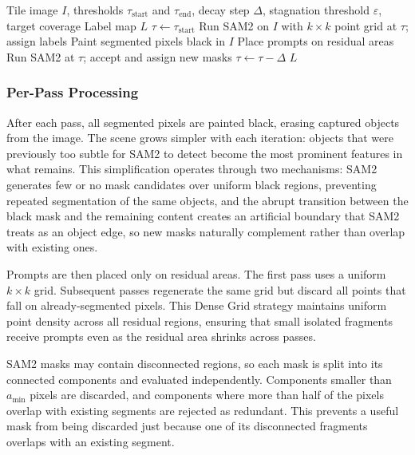 \documentclass[review,11pt,authoryear]{elsarticle}
\begin{document}
\begin{algorithm}[h!]
\caption{Multi-pass adaptive segmentation (per tile)}
\label{alg:multipass}
\begin{algorithmic}[1]
\REQUIRE Tile image $I$, thresholds $\tau_{\text{start}}$ and $\tau_{\text{end}}$, decay step $\Delta$, stagnation threshold $\varepsilon$, target coverage
\ENSURE Label map $L$
\STATE $\tau \leftarrow \tau_{\text{start}}$
\STATE Run SAM2 on $I$ with $k \times k$ point grid at $\tau$; assign labels
\REPEAT
    \STATE Paint segmented pixels black in $I$
    \STATE Place prompts on residual areas
    \STATE Run SAM2 at $\tau$; accept and assign new masks
        \STATE $\tau \leftarrow \tau - \Delta$
    \ENDIF
{}
\RETURN $L$
\end{algorithmic}
\end{algorithm}

\subsubsection{Per-Pass Processing}
\label{sec:method_pass}
\label{sec:method_blackmask}

After each pass, all segmented pixels are painted black, erasing captured objects from the image. The scene grows simpler with each iteration: objects that were previously too subtle for SAM2 to detect become the most prominent features in what remains. This simplification operates through two mechanisms: SAM2 generates few or no mask candidates over uniform black regions, preventing repeated segmentation of the same objects, and the abrupt transition between the black mask and the remaining content creates an artificial boundary that SAM2 treats as an object edge, so new masks naturally complement rather than overlap with existing ones.

Prompts are then placed only on residual areas. The first pass uses a uniform $k \times k$ grid. Subsequent passes regenerate the same grid but discard all points that fall on already-segmented pixels. This Dense Grid strategy maintains uniform point density across all residual regions, ensuring that small isolated fragments receive prompts even as the residual area shrinks across passes.

SAM2 masks may contain disconnected regions, so each mask is split into its connected components and evaluated independently. Components smaller than $a_{\min}$ pixels are discarded, and components where more than half of the pixels overlap with existing segments are rejected as redundant. This prevents a useful mask from being discarded just because one of its disconnected fragments overlaps with an existing segment.
\end{document}
